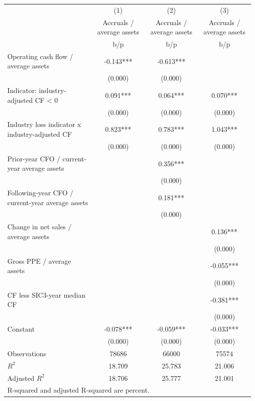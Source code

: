 {
\def\sym#1{\ifmmode^{#1}\else\(^{#1}\)\fi}
\begin{tabular}{l*{3}{c}}
\hline\hline
                    &\multicolumn{1}{c}{(1)}&\multicolumn{1}{c}{(2)}&\multicolumn{1}{c}{(3)}\\
                    &\multicolumn{1}{c}{Accruals / average assets}&\multicolumn{1}{c}{Accruals / average assets}&\multicolumn{1}{c}{Accruals / average assets}\\
                    &         b/p   &         b/p   &         b/p   \\
\hline
Operating cash flow / average assets&      -0.143***&      -0.613***&               \\
                    &     (0.000)   &     (0.000)   &               \\
Indicator: industry-adjusted CF < 0&       0.091***&       0.064***&       0.070***\\
                    &     (0.000)   &     (0.000)   &     (0.000)   \\
Industry loss indicator x industry-adjusted CF&       0.823***&       0.783***&       1.043***\\
                    &     (0.000)   &     (0.000)   &     (0.000)   \\
Prior-year CFO / current-year average assets&               &       0.356***&               \\
                    &               &     (0.000)   &               \\
Following-year CFO / current-year average assets&               &       0.181***&               \\
                    &               &     (0.000)   &               \\
Change in net sales / average assets&               &               &       0.136***\\
                    &               &               &     (0.000)   \\
Gross PPE / average assets&               &               &      -0.055***\\
                    &               &               &     (0.000)   \\
CF less SIC3-year median CF&               &               &      -0.381***\\
                    &               &               &     (0.000)   \\
Constant            &      -0.078***&      -0.059***&      -0.033***\\
                    &     (0.000)   &     (0.000)   &     (0.000)   \\
\hline
Observations        &       78686   &       66000   &       75574   \\
\(R^{2}\)           &      18.709   &      25.783   &      21.006   \\
Adjusted \(R^{2}\)  &      18.706   &      25.777   &      21.001   \\
\hline\hline
\multicolumn{4}{l}{\footnotesize R-squared and adjusted R-squared are percent.}\\
\end{tabular}
}
